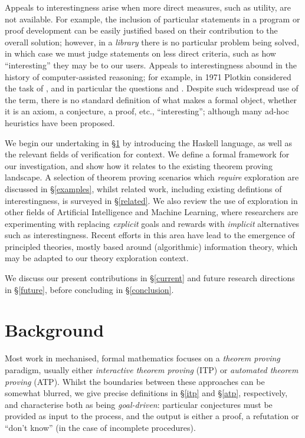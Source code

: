 \documentclass[]{article}
\begin{document}
Appeals to interestingness arise when more direct measures, such as utility, are not available. For example, the inclusion of particular statements in a program or proof development can be easily justified based on their contribution to the overall solution; however, in a \emph{library} there is no particular problem being solved, in which case we must judge statements on less direct criteria, such as how ``interesting'' they may be to our users. Appeals to interestingness abound in the history of computer-assisted reasoning; for example, in 1971 Plotkin \cite{plotkin1971further} considered the task of , and in particular the questions  and . Despite such widespread use of the term, there is no standard definition of what makes a formal object, whether it is an axiom, a conjecture, a proof, etc., ``interesting''; although many ad-hoc heuristics have been proposed.

We begin our undertaking in \S \ref{background} by introducing the Haskell language, as well as the relevant fields of verification for context. We define a formal framework for our investigation, and show how it relates to the existing theorem proving landscape. A selection of theorem proving scenarios which \emph{require} exploration are discussed in \S \ref{examples}, whilst related work, including existing defintions of interestingness, is surveyed in \S \ref{related}. We also review the use of exploration in other fields of Artificial Intelligence and Machine Learning, where researchers are experimenting with replacing \emph{explicit} goals and rewards with \emph{implicit} alternatives such as interestingness. Recent efforts in this area have lead to the emergence of principled theories, mostly based around (algorithmic) information theory, which may be adapted to our theory exploration context.

We discuss our present contributions in \S \ref{current} and future research directions in \S \ref{future}, before concluding in \S \ref{conclusion}.

\section{Background}
\label{background}

Most work in mechanised, formal mathematics focuses on a \emph{theorem proving} paradigm, usually either \emph{interactive theorem proving} (ITP) or \emph{automated theorem proving} (ATP). Whilst the boundaries between these approaches can be somewhat blurred, we give precise definitions in \S \ref{itp} and \S \ref{atp}, respectively, and characterise both as being \emph{goal-driven}: particular conjectures must be provided as input to the process, and the output is either a proof, a refutation or ``don't know'' (in the case of incomplete procedures).
\end{document}

